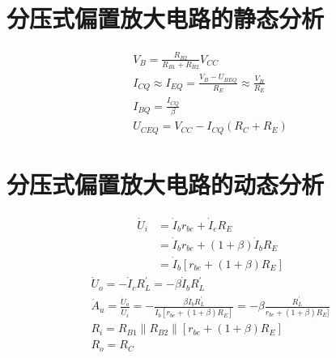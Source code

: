 \documentclass{ctexart}
\begin{document}
\section{分压式偏置放大电路的静态分析}
\begin{gather*}
V_B = \frac{R_{B2}}{R_{B1} + R_{B2}}V_{CC} \\
I_{CQ} \approx I_{EQ} = \frac{V_B - U_{BEQ}}{R_E} \approx \frac{V_B}{R_E} \\
I_{BQ} = \frac{I_{CQ}}{\beta} \\
U_{CEQ} = V_{CC} - I_{CQ}(R_C + R_E)
\end{gather*}

\newpage

\section{分压式偏置放大电路的动态分析}
\begin{align*}
\dot{U}_i &= \dot{I}_b r_{be} + \dot{I}_e R_E \\
          &= \dot{I}_b r_{be} + (1 + \beta)\dot{I}_b R_E \\
          &= \dot{I}_b [r_{be} + (1 + \beta) R_E]
\end{align*}
\begin{gather*}
\dot{U}_o = -\dot{I}_c R^{'}_L = -\beta \dot{I}_b R^{'}_L \\
\dot{A}_{u} = \frac{\dot{U}_o}{\dot{U}_i} = -\frac{\beta\dot{I}_b R^{'}_L}{\dot{I}_b[r_{be} + (1 + \beta)R_E]} = -\beta\frac{R^{'}_L}{r_{be} + (1 + \beta)R_E]} \\
R_i = R_{B1} \parallel R_{B2} \parallel [r_{be} + (1 + \beta)R_E] \\
R_o = R_C
\end{gather*}
\end{document}
